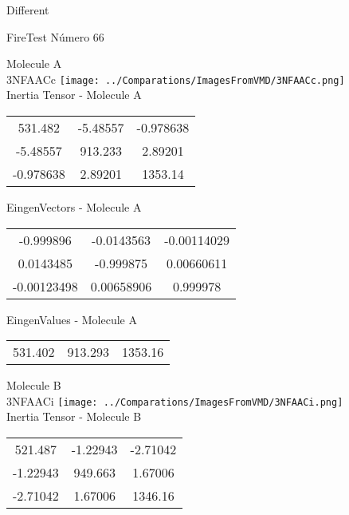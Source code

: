 \begin{center}
\vtab
\vtab
\textcolor{NavyBlue}{\Large Different}
\end{center}

 \newpage

\vtab[-2cm]
\begin{center}
{\large FireTest \tab Número 66}
\end{center}
\begin{multicols}{2}
\begin{center}

Molecule A \\ 
3NFAACc
\texttt{[image: ../Comparations/ImagesFromVMD/3NFAACc.png]}
\\
Inertia Tensor - Molecule A \\
\vtab

\begin{tabular}{|c c c|}
531.482	 & 	-5.48557	 & 	-0.978638	 \\
-5.48557	 & 	913.233	 & 	2.89201	 \\
-0.978638	 & 	2.89201	 & 	1353.14
\end{tabular}

\vtab
 EingenVectors - Molecule A     \\
\vtab
\begin{tabular}{|c c c|}
-0.999896	 & 	-0.0143563	 & 	-0.00114029	 \\
0.0143485	 & 	-0.999875	 & 	0.00660611	 \\
-0.00123498	 & 	0.00658906	 & 	0.999978
\end{tabular}

\vtab
 EingenValues - Molecule A     \\
\vtab
\begin{tabular}{|c c c|}
531.402	 & 	913.293	 & 	1353.16	 \\
\end{tabular}
\columnbreak

Molecule B \\ 
3NFAACi
\texttt{[image: ../Comparations/ImagesFromVMD/3NFAACi.png]}
\\
Inertia Tensor - Molecule B \\
\vtab

\begin{tabular}{|c c c|}
521.487	 & 	-1.22943	 & 	-2.71042	 \\
-1.22943	 & 	949.663	 & 	1.67006	 \\
-2.71042	 & 	1.67006	 & 	1346.16
\end{tabular}


\end{center}
\end{multicols}
